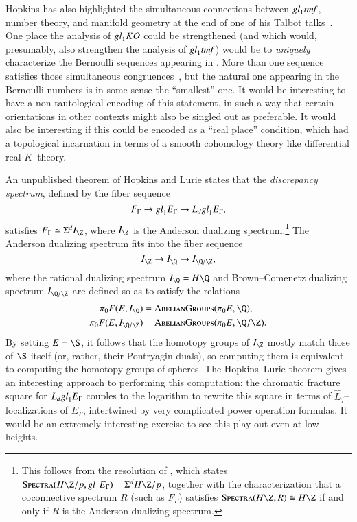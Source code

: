 Hopkins has also highlighted the simultaneous connections between $\mathit{gl}_1 \mathit{tmf}$, number theory, and manifold geometry at the end of one of his Talbot talks~\cite{HopkinsTheStringOrientation}.  One place the analysis of $\mathit{gl}_1 KO$ could be strengthened (and which would, presumably, also strengthen the analysis of $\mathit{gl}_1 \mathit{tmf}$) would be to \emph{uniquely} characterize the Bernoulli sequences appearing in .  More than one sequence satisfies those simultaneous congruences~\cite{SprangNaumann}, but the natural one appearing in the Bernoulli numbers is in some sense the ``smallest'' one.  It would be interesting to have a non-tautological encoding of this statement, in such a way that certain orientations in other contexts might also be singled out as preferable.  It would also be interesting if this could be encoded as a ``real place'' condition, which had a topological incarnation in terms of a smooth cohomology theory like differential real $K$--theory.

An unpublished theorem of Hopkins and Lurie states that the \textit{discrepancy spectrum}, defined by the fiber sequence \[F_\Gamma \to \mathit{gl}_1 E_\Gamma \to L_d \mathit{gl}_1 E_\Gamma,\] satisfies $F_\Gamma \simeq \Susp^d I_{\Z}$, where $I_{\Z}$ is the Anderson dualizing spectrum.\footnote{This follows from the resolution of \cite[Conjecture 5.4.14]{HopkinsLurie}, which states $\CatOf{Spectra}(H\Z/p, \gl_1 E_\Gamma) = \Susp^d H\Z/p$, together with the characterization that a coconnective spectrum $R$ (such as $F_\Gamma$) satisfies $\CatOf{Spectra}(H\Z, R) \cong H\Z$ if and only if $R$ is the Anderson dualizing spectrum.}  The Anderson dualizing spectrum fits into the fiber sequence \[I_{\Z} \to I_{\Q} \to I_{\Q/\Z},\] where the rational dualizing spectrum $I_{\Q} = H\Q$ and Brown--Comenetz dualizing spectrum $I_{\Q/\Z}$ are defined so as to satisfy the relations
\begin{align*}
\pi_0 F(E, I_{\Q}) & = \CatOf{AbelianGroups}(\pi_0 E, \Q), \\
\pi_0 F(E, I_{\Q/\Z}) & = \CatOf{AbelianGroups}(\pi_0 E, \Q/\Z).
\end{align*}
By setting $E = \S$, it follows that the homotopy groups of $I_{\Z}$ mostly match those of $\S$ itself (or, rather, their Pontryagin duals), so computing them is equivalent to computing the homotopy groups of spheres.  The Hopkins--Lurie theorem gives an interesting approach to performing this computation: the chromatic fracture square for $L_d \mathit{gl}_1 E_\Gamma$ couples to the logarithm to rewrite this square in terms of $\widehat L_j$--localizations of $E_\Gamma$, intertwined by very complicated power operation formulas.  It would be an extremely interesting exercise to see this play out even at low heights.

